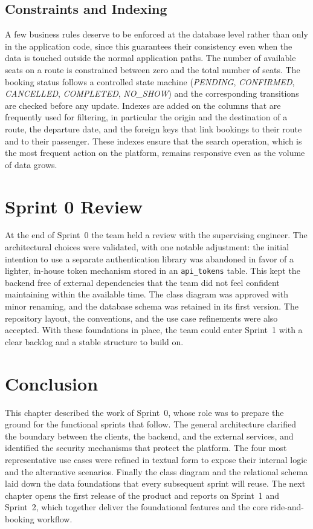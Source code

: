 \subsection{Constraints and Indexing}

A few business rules deserve to be enforced at the database level rather than only in the application code, since this guarantees their consistency even when the data is touched outside the normal application paths. The number of available seats on a route is constrained between zero and the total number of seats. The booking status follows a controlled state machine (\textit{PENDING}, \textit{CONFIRMED}, \textit{CANCELLED}, \textit{COMPLETED}, \textit{NO\_SHOW}) and the corresponding transitions are checked before any update. Indexes are added on the columns that are frequently used for filtering, in particular the origin and the destination of a route, the departure date, and the foreign keys that link bookings to their route and to their passenger. These indexes ensure that the search operation, which is the most frequent action on the platform, remains responsive even as the volume of data grows.

\section{Sprint 0 Review}

At the end of Sprint~0 the team held a review with the supervising engineer. The architectural choices were validated, with one notable adjustment: the initial intention to use a separate authentication library was abandoned in favor of a lighter, in-house token mechanism stored in an \texttt{api\_tokens} table. This kept the backend free of external dependencies that the team did not feel confident maintaining within the available time. The class diagram was approved with minor renaming, and the database schema was retained in its first version. The repository layout, the conventions, and the use case refinements were also accepted. With these foundations in place, the team could enter Sprint~1 with a clear backlog and a stable structure to build on.

\section*{Conclusion}

This chapter described the work of Sprint~0, whose role was to prepare the ground for the functional sprints that follow. The general architecture clarified the boundary between the clients, the backend, and the external services, and identified the security mechanisms that protect the platform. The four most representative use cases were refined in textual form to expose their internal logic and the alternative scenarios. Finally the class diagram and the relational schema laid down the data foundations that every subsequent sprint will reuse. The next chapter opens the first release of the product and reports on Sprint~1 and Sprint~2, which together deliver the foundational features and the core ride-and-booking workflow.
